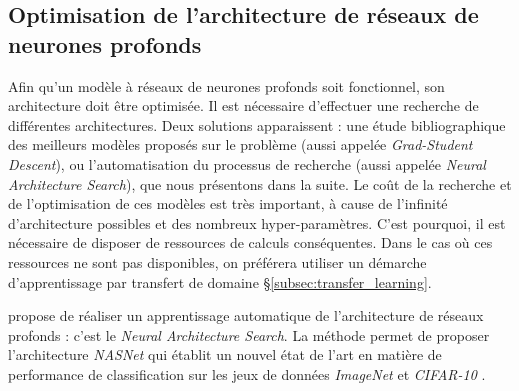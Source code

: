 \subsection{Optimisation de l'architecture de réseaux de neurones profonds} \label{subsec:nas}
Afin qu'un modèle à réseaux de neurones profonds soit fonctionnel, son architecture doit être optimisée.
Il est nécessaire d'effectuer une recherche de différentes architectures.
Deux solutions apparaissent : une étude bibliographique des meilleurs modèles proposés sur le problème (aussi appelée \textit{Grad-Student Descent}), ou l'automatisation du processus de recherche (aussi appelée \textit{Neural Architecture Search}), que nous présentons dans la suite.
Le coût de la recherche et de l'optimisation de ces modèles est très important, à cause de l'infinité d'architecture possibles et des nombreux hyper-paramètres.
C'est pourquoi, il est nécessaire de disposer de ressources de calculs conséquentes.
Dans le cas où ces ressources ne sont pas disponibles, on préférera utiliser un démarche d'apprentissage par transfert de domaine §\ref{subsec:transfer_learning}.

\citeauthor{zoph_neural_2016} \cite{zoph_neural_2016} propose de réaliser un apprentissage automatique de l'architecture de réseaux profonds : c'est le \textit{Neural Architecture Search}.
La méthode permet de proposer l'architecture \textit{NASNet} \cite{zoph_learning_2017} qui établit un nouvel état de l'art en matière de performance de classification sur les jeux de données \textit{ImageNet} et \textit{CIFAR-10} \cite{krizhevsky2009learning}.

